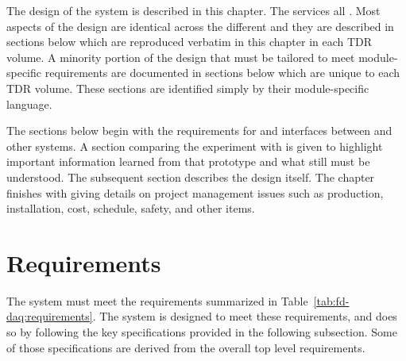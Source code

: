The design of the    system is described in this chapter.  The  services all  .  Most  aspects of the design are identical across the different  and they are described in sections below which are reproduced verbatim in this  chapter in each  TDR volume.  A minority portion of the  design that must be tailored to meet module-specific requirements are documented in sections below which are unique to each  TDR volume.  These sections are identified simply by their module-specific language.

The sections below begin with the requirements for and interfaces between  and other  systems.  A section comparing the  experiment with  is given to highlight important information learned from that prototype and what still must be understood.  The subsequent section describes the design itself.  The chapter finishes with giving details on project management issues such as production, installation, cost, schedule, safety, and other items.

\section{Requirements}
\label{sec:fd-daq:requirements}


The    system must meet the requirements 
summarized in Table~\ref{tab:fd-daq:requirements}. The system is
designed to meet these requirements, and does so by following the key
specifications provided in the following subsection. Some of those
specifications are derived from the overall   top level requirements.

% 



